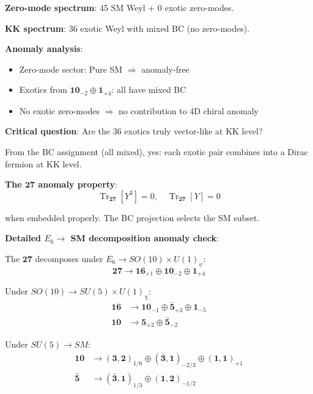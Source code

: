 \documentclass[11pt,a4paper]{article}
\DeclareMathOperator{\Tr}{Tr}
\begin{document}
\begin{auditbox}
\textbf{Zero-mode spectrum}: 45 SM Weyl + 0 exotic zero-modes.

\textbf{KK spectrum}: 36 exotic Weyl with mixed BC (no zero-modes).

\textbf{Anomaly analysis}:
\begin{itemize}
    \item Zero-mode sector: Pure SM $\Rightarrow$ anomaly-free
    \item Exotics from $\mathbf{10}_{-2} \oplus \mathbf{1}_{+4}$: all have mixed BC
    \item No exotic zero-modes $\Rightarrow$ no contribution to 4D chiral anomaly
\end{itemize}

\textbf{Critical question}: Are the 36 exotics truly vector-like at KK level?

From the BC assignment (all mixed), yes: each exotic pair combines into a Dirac fermion at KK level.

\textbf{The $\mathbf{27}$ anomaly property}:
\begin{equation}
\label{eq:e6-27-anomaly}
\Tr_{\mathbf{27}}[Y^3] = 0, \quad \Tr_{\mathbf{27}}[Y] = 0
\end{equation}

when embedded properly. The BC projection selects the SM subset.

\textbf{Detailed $E_6 \to$ SM decomposition anomaly check}:

The $\mathbf{27}$ decomposes under $E_6 \to SO(10) \times U(1)_\psi$:
\begin{equation}
\label{eq:e6-so10-decomp}
\mathbf{27} \to \mathbf{16}_{+1} \oplus \mathbf{10}_{-2} \oplus \mathbf{1}_{+4}
\end{equation}

Under $SO(10) \to SU(5) \times U(1)_\chi$:
\begin{align}
\label{eq:so10-16-decomp}
\mathbf{16} &\to \mathbf{10}_{-1} \oplus \bar{\mathbf{5}}_{+3} \oplus \mathbf{1}_{-5} \\
\label{eq:so10-10-decomp}
\mathbf{10} &\to \mathbf{5}_{+2} \oplus \bar{\mathbf{5}}_{-2}
\end{align}

Under $SU(5) \to SM$:
\begin{align}
\label{eq:su5-10-sm}
\mathbf{10} &\to (\mathbf{3}, \mathbf{2})_{1/6} \oplus (\bar{\mathbf{3}}, \mathbf{1})_{-2/3} \oplus (\mathbf{1}, \mathbf{1})_{+1} \\
\label{eq:su5-5bar-sm}
\bar{\mathbf{5}} &\to (\bar{\mathbf{3}}, \mathbf{1})_{1/3} \oplus (\mathbf{1}, \mathbf{2})_{-1/2}
\end{align}


\end{auditbox}
\end{document}
